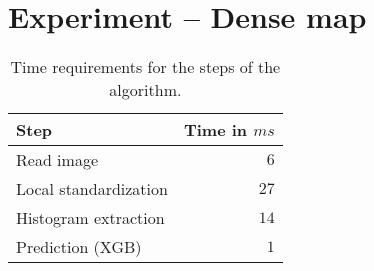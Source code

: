 \section{Experiment -- Dense map}
\label{sec:experiment4}

\begin{table}[h!]
  \centering
  \begin{tabular}{lr}
    \toprule
    Step & Time in $ms$\\
    \midrule
    Read image & $6$\\
    Local standardization & $27$\\
    Histogram extraction & $14$\\
    Prediction (XGB) & $1$\\    
    \bottomrule
  \end{tabular}
  \caption{{Time requirements for the steps of the algorithm.}}
  \label{tab:timerequirementsdense}

\end{table}

